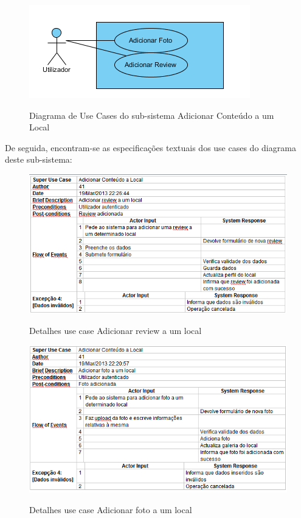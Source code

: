﻿\documentclass[12pt,a4paper]{article}
\begin{document}
\begin{figure}[h!]
\centering
\includegraphics[scale=1]{usecase/U_AdicionarConteudo}
\label{usecase}
\caption{Diagrama de Use Cases do sub-sistema Adicionar Conteúdo a um Local}
\end{figure}

De seguida, encontram-se as especificações textuais dos use cases do diagrama deste sub-sistema:\\


\begin{figure}[h!]
\centering
\includegraphics[scale=0.7]{d_usecase/adicionarreview}
\label{usecase}
\caption{Detalhes use case Adicionar review a um local}
\end{figure}

\begin{figure}[h!]
\centering
\includegraphics[scale=0.7]{d_usecase/adicionarfoto}
\label{usecase}
\caption{Detalhes use case Adicionar foto a um local}
\end{figure}
\end{document}
